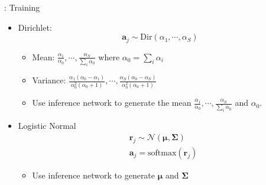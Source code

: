 \begin{frame}{\subsecname: Training}
    \begin{itemize}
        \item<1-> Dirichlet:
        \begin{equation*}
            \mathbf{a}_j\sim \text{Dir}(\alpha_1,\cdots,\alpha_S)
        \end{equation*}
        \begin{itemize}
            \item Mean: $\frac{\alpha_1}{\alpha_0}, \cdots, \frac{\alpha_S}{\sum_i \alpha_0}$ where $\alpha_0=\sum_i \alpha_i$
            \item Variance: $\frac{\alpha_1(\alpha_0-\alpha_1)}{\alpha_0^2(\alpha_0+1)},\cdots,\frac{\alpha_S(\alpha_0-\alpha_S)}{\alpha_0^2(\alpha_0+1)}$
            \item Use inference network to generate the mean $\frac{\alpha_1}{\alpha_0}, \cdots, \frac{\alpha_S}{\sum_i \alpha_0}$ and $\alpha_0$.
        \end{itemize}
        \item<2-> Logistic Normal
        \begin{align*}
            &\mathbf{r}_j\sim \mathcal{N}(\mathbf{\mu}, \mathbf{\Sigma})\\
            &\mathbf{a}_j = \text{softmax}(\mathbf{r}_j)
        \end{align*}
        \begin{itemize}
            \item Use inference network to generate $\mathbf{\mu}$ and $\mathbf{\Sigma}$
        \end{itemize}
\end{itemize}
 
\end{frame}
